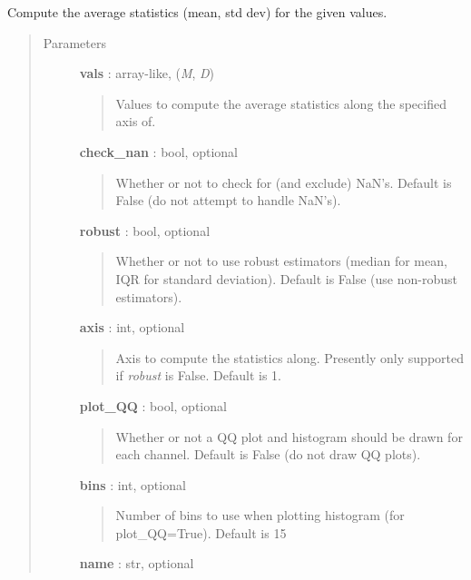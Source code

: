 \documentclass[letterpaper,10pt,english]{sphinxmanual}
\begin{document}
\begin{fulllineitems}
\label{gptools:gptools.utils.compute_stats}
Compute the average statistics (mean, std dev) for the given values.
\begin{quote}\begin{description}
\item[{Parameters}] \leavevmode
\textbf{vals} : array-like, (\emph{M}, \emph{D})
\begin{quote}

Values to compute the average statistics along the specified axis of.
\end{quote}

\textbf{check\_nan} : bool, optional
\begin{quote}

Whether or not to check for (and exclude) NaN's. Default is False (do
not attempt to handle NaN's).
\end{quote}

\textbf{robust} : bool, optional
\begin{quote}

Whether or not to use robust estimators (median for mean, IQR for
standard deviation). Default is False (use non-robust estimators).
\end{quote}

\textbf{axis} : int, optional
\begin{quote}

Axis to compute the statistics along. Presently only supported if
\emph{robust} is False. Default is 1.
\end{quote}

\textbf{plot\_QQ} : bool, optional
\begin{quote}

Whether or not a QQ plot and histogram should be drawn for each channel.
Default is False (do not draw QQ plots).
\end{quote}

\textbf{bins} : int, optional
\begin{quote}

Number of bins to use when plotting histogram (for plot\_QQ=True).
Default is 15
\end{quote}

\textbf{name} : str, optional
\begin{quote}


\end{quote}
\end{description}
\end{quote}
\end{fulllineitems}
\end{document}
